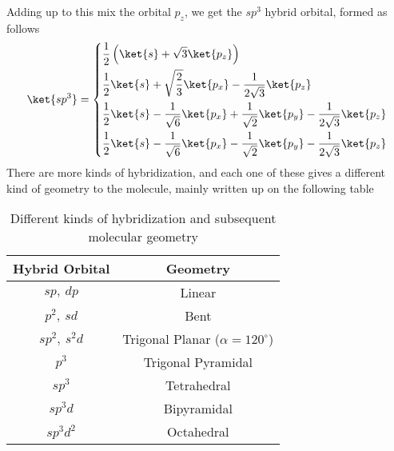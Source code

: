 \documentclass[a4paper, 11pt]{book}
\newcommand{\1}{\opr{\mathds{1}}}
\theoremstyle{plain}
\begin{document}
	Adding up to this mix the orbital $p_z$, we get the $sp^3$ hybrid orbital, formed as follows
	\begin{equation}
		\ket{sp^3}=\left\{\begin{aligned}
				&\frac{1}{2}\left( \ket{s}+\sqrt{3}\ket{p_z} \right)\\
				&\frac{1}{2}\ket{s}+\sqrt{\frac{2}{3}}\ket{p_x}-\frac{1}{2\sqrt{3}}\ket{p_z}\\
				&\frac{1}{2}\ket{s}-\frac{1}{\sqrt{6}}\ket{p_x}+\frac{1}{\sqrt{2}}\ket{p_y}-\frac{1}{2\sqrt{3}}\ket{p_z}\\
				&\frac{1}{2}\ket{s}-\frac{1}{\sqrt{6}}\ket{p_x}-\frac{1}{\sqrt{2}}\ket{p_y}-\frac{1}{2\sqrt{3}}\ket{p_z}
		\end{aligned}\right.
		\label{eq:sp3hybridization}
	\end{equation}
	There are more kinds of hybridization, and each one of these gives a different kind of geometry to the molecule, mainly written up on the following table
	\begin{table}[H]
		\centering
		\begin{tabular}{|c|c|}
			\hline
			Hybrid Orbital & Geometry\\
			\hline
			$sp,\ dp$& Linear\\
			$p^2,\ sd$& Bent\\
			$sp^2,\ s^2d$& Trigonal Planar ($\alpha=120^{\circ}$)\\
			$p^3$& Trigonal Pyramidal\\
			$sp^3$& Tetrahedral\\
			$sp^3d$& Bipyramidal\\
			$sp^3d^2$& Octahedral\\
			\hline
		\end{tabular}
		\caption{Different kinds of hybridization and subsequent molecular geometry}
		\label{tab:hybridorbitalstable}
	\end{table}
\end{document}
